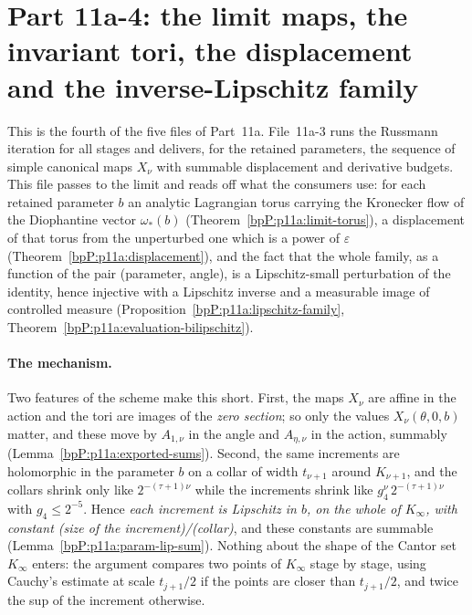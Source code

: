 \section{Part 11a-4: the limit maps, the invariant tori, the displacement and the inverse-Lipschitz family}\label{bpP:p11a4}
\begingroup\sloppy

\def\Ddom#1#2#3{\mathcal D(#1,#2;#3)}
\def\opnm#1{\lvert #1\rvert_{\mathrm{op}}}
\def\Phin#1{\Phi^{(#1)}}
\def\lamstar{\lambda_{*}}

This is the fourth of the five files of Part~11a. File~11a-3 runs the Russmann iteration for all stages and delivers, for the retained parameters, the sequence of simple canonical maps $X_\nu$ with summable displacement and derivative budgets. This file passes to the limit and reads off what the consumers use: for each retained parameter $b$ an analytic Lagrangian torus carrying the Kronecker flow of the Diophantine vector $\omega_*(b)$ (Theorem~\ref{bpP:p11a:limit-torus}), a displacement of that torus from the unperturbed one which is a power of $\varepsilon$ (Theorem~\ref{bpP:p11a:displacement}), and the fact that the whole family, as a function of the pair (parameter, angle), is a Lipschitz-small perturbation of the identity, hence injective with a Lipschitz inverse and a measurable image of controlled measure (Proposition~\ref{bpP:p11a:lipschitz-family}, Theorem~\ref{bpP:p11a:evaluation-bilipschitz}).

\paragraph{The mechanism.} Two features of the scheme make this short. First, the maps $X_\nu$ are affine in the action and the tori are images of the \emph{zero section}; so only the values $X_\nu(\theta,0,b)$ matter, and these move by $A_{1,\nu}$ in the angle and $A_{\eta,\nu}$ in the action, summably (Lemma~\ref{bpP:p11a:exported-sums}). Second, the same increments are holomorphic in the parameter $b$ on a collar of width $t_{\nu+1}$ around $K_{\nu+1}$, and the collars shrink only like $2^{-(\tau+1)\nu}$ while the increments shrink like $g_4^{\nu}\,2^{-(\tau+1)\nu}$ with $g_4\le2^{-5}$. Hence \emph{each increment is Lipschitz in $b$, on the whole of $K_\infty$, with constant (size of the increment)/(collar)}, and these constants are summable (Lemma~\ref{bpP:p11a:param-lip-sum}). Nothing about the shape of the Cantor set $K_\infty$ enters: the argument compares two points of $K_\infty$ stage by stage, using Cauchy's estimate at scale $t_{j+1}/2$ if the points are closer than $t_{j+1}/2$, and twice the sup of the increment otherwise.

